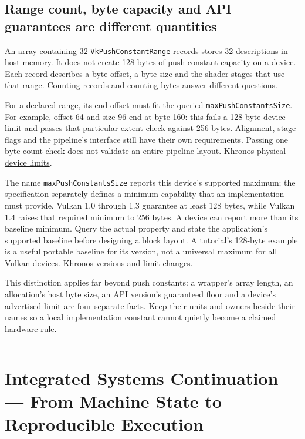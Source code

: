 \subsection{Range count, byte capacity and API guarantees are different quantities}\label{01-foundations-i-ch016-range-count-byte-capacity-and-api-guarantees-are-different-quantities}

An array containing 32 \texttt{VkPushConstantRange} records stores 32 descriptions in host memory. It does not create 128 bytes of push-constant capacity on a device. Each record describes a byte offset, a byte size and the shader stages that use that range. Counting records and counting bytes answer different questions.

For a declared range, its end offset must fit the queried \texttt{maxPushConstantsSize}. For example, offset 64 and size 96 end at byte 160: this fails a 128-byte device limit and passes that particular extent check against 256 bytes. Alignment, stage flags and the pipeline's interface still have their own requirements. Passing one byte-count check does not validate an entire pipeline layout. \href{https://docs.vulkan.org/spec/latest/chapters/limits.html}{Khronos physical-device limits}.

The name \texttt{maxPushConstantsSize} reports this device's supported maximum; the specification separately defines a minimum capability that an implementation must provide. Vulkan 1.0 through 1.3 guarantee at least 128 bytes, while Vulkan 1.4 raises that required minimum to 256 bytes. A device can report more than its baseline minimum. Query the actual property and state the application's supported baseline before designing a block layout. A tutorial's 128-byte example is a useful portable baseline for its version, not a universal maximum for all Vulkan devices. \href{https://docs.vulkan.org/guide/latest/versions.html}{Khronos versions and limit changes}.

This distinction applies far beyond push constants: a wrapper's array length, an allocation's host byte size, an API version's guaranteed floor and a device's advertised limit are four separate facts. Keep their units and owners beside their names so a local implementation constant cannot quietly become a claimed hardware rule.

\begin{center}\rule{0.5\linewidth}{0.5pt}\end{center}

\section{Integrated Systems Continuation --- From Machine State to Reproducible Execution}\label{01-foundations-i-ch016-integrated-systems-continuation-from-machine-state-to-reproducible-execution}

